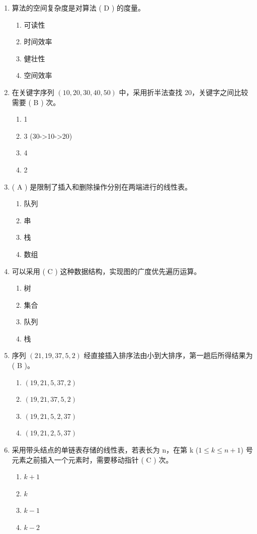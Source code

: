 \documentclass[12pt, a4paper]{article}
\begin{document}
\begin{enumerate}[label=\arabic*.]
    \item 算法的空间复杂度是对算法 ( D ) 的度量。
    \begin{enumerate}
        \item 可读性
        \item 时间效率
        \item 健壮性
        \item 空间效率
    \end{enumerate}

    \item 在关键字序列 $(10, 20, 30, 40, 50)$ 中，采用折半法查找 20，关键字之间比较需要 ( B ) 次。
    \begin{enumerate}
        \item 1
        \item 3 (30->10->20)
        \item 4
        \item 2
    \end{enumerate}

    \item ( A ) 是限制了插入和删除操作分别在两端进行的线性表。
    \begin{enumerate}
        \item 队列
        \item 串
        \item 栈
        \item 数组
    \end{enumerate}

    \item 可以采用 ( C ) 这种数据结构，实现图的广度优先遍历运算。
    \begin{enumerate}
        \item 树
        \item 集合
        \item 队列
        \item 栈
    \end{enumerate}

    \item 序列 $(21, 19, 37, 5, 2)$ 经直接插入排序法由小到大排序，第一趟后所得结果为 ( B )。
    \begin{enumerate}
        \item $(19, 21, 5, 37, 2)$
        \item $(19, 21, 37, 5, 2)$
        \item $(19, 21, 5, 2, 37)$
        \item $(19, 21, 2, 5, 37)$
    \end{enumerate}

    \item 采用带头结点的单链表存储的线性表，若表长为 n，在第 k ($1 \le k \le n+1$) 号元素之前插入一个元素时，需要移动指针 ( C ) 次。
    \begin{enumerate}
        \item $k+1$
        \item $k$
        \item $k-1$
        \item $k-2$
    \end{enumerate}
\end{enumerate}
\end{document}
